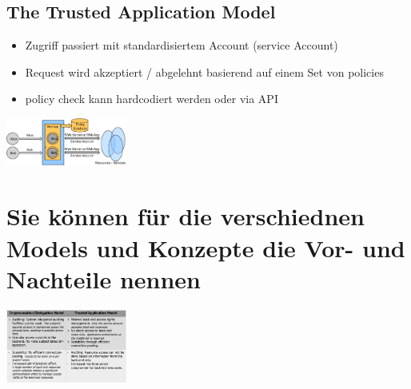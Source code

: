 \documentclass{report}
\newenvironment{Figure}
	{\par\medskip\noindent\minipage{\linewidth}}
	{\endminipage\par\medskip}
\theoremstyle{definition}
\theoremstyle{example}
\begin{document}
	\subsection{The Trusted Application Model}
\begin{itemize}
	\item Zugriff passiert mit standardisiertem Account (service Account)
	\item Request wird akzeptiert / abgelehnt basierend auf einem Set von policies
	\item policy check kann hardcodiert werden oder via API
\end{itemize}
\begin{Figure}
\centering
\includegraphics[width=150px]{img/TrustedApplicationModel.png}
	\label{fig:Abbildung Schema Trusted Application Model}
\end{Figure}

\section{Sie können für die verschiednen Models und Konzepte die Vor- und Nachteile nennen}
\begin{Figure}
\centering
\includegraphics[width=150px]{img/ImpersVsTrusted.png}
	\label{fig:Abbildung Vergleich zwischen Impersonation und Trusted Application Model}
\end{Figure}
\end{document}
